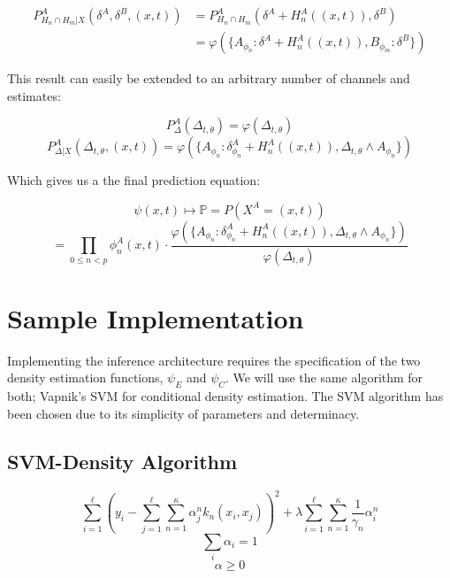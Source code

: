 \documentclass[10pt]{article}
\begin{document}
\begin{align}
P_{H_n \cap H_m | X}^A \left( \delta^A, \delta^B, (x,t) \right) &= P_{H_n \cap H_m}^A \left( \delta^A + H_n^A((x,t)), \delta^B \right) \nonumber \\
&= \varphi \left( \{ A_{\phi_n}:\delta^A + H_n^A((x,t)), B_{\phi_m}: \delta^B \} \right)
\end{align}

This result can easily be extended to an arbitrary number of channels and estimates:

\begin{equation} P_\Delta^A \left( \Delta_{t,\theta} \right) = \varphi \left( \Delta_{t,\theta} \right) \end{equation}
\begin{equation} P_{\Delta|X}^A \left( \Delta_{t,\theta}, (x,t) \right) = \varphi \left( \{ A_{\phi_n} : \delta_{\phi_n}^A + H_n^A((x,t)), \Delta_{t,\theta} \land A_{\phi_n} \} \right) \end{equation}

Which gives us a the final prediction equation:

\[ \psi(x,t) \mapsto \mathbb{P} = P(X^A = (x,t) ) \]
\begin{equation} 
= \prod_{0 \le n < p} \phi_n^A( x, t) \cdot \frac{ \varphi \left( \{ A_{\phi_n} : \delta_{\phi_n}^A + H_n^A((x,t)), \Delta_{t,\theta} \land A_{\phi_n} \} \right) }{ \varphi( \Delta_{t,\theta} ) }
\end{equation}

\section{Sample Implementation}
Implementing the inference architecture requires the specification of the two density estimation functions, \( \psi_E \) and \( \psi_C \).  We will use the same algorithm for both; Vapnik's SVM for conditional density estimation.  The SVM algorithm has been chosen due to its simplicity of parameters and determinacy. 

 
\subsection{SVM-Density Algorithm}
\begin{equation}\sum_{i=1}^\ell \left( y_i - \sum_{j=1}^\ell \sum_{n=1}^\kappa \alpha_j^n k_n(x_i, x_j) \right)^2 + \lambda \sum_{i=1}^\ell \sum_{n=1}^\kappa \frac{1}{\gamma_n}\alpha_i^n \end{equation}
\begin{equation} \sum_i \alpha_i = 1 \end{equation}
\begin{equation} \alpha \ge 0 \end{equation}
\end{document}
